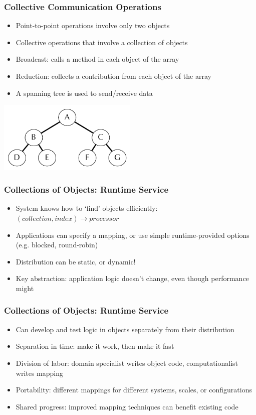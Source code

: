 \begin{frame}[fragile]
  \frametitle{Collective Communication Operations}
  \begin{itemize}
    \item Point-to-point operations involve only two objects
    \item Collective operations that involve a collection of objects
    \item Broadcast: calls a method in each object of the array
    \item Reduction: collects a contribution from each object of the array
    \item A spanning tree is used to send/receive data
  \end{itemize}
    \begin{center} \includegraphics[width=0.5\textwidth]{figures/spanningTree.pdf} \end{center}
\end{frame}

\begin{frame}[fragile]
  \frametitle{Collections of Objects: Runtime Service}
  \begin{itemize}
    \item System knows how to `find' objects efficiently: $(collection, index) \to processor$
    \item Applications can specify a mapping, or use simple
      runtime-provided options (e.g. blocked, round-robin)
    \item Distribution can be static, or dynamic!
    \item Key abstraction: application logic doesn't change, even
      though performance might
  \end{itemize}
\end{frame}

\begin{frame}[fragile]
  \frametitle{Collections of Objects: Runtime Service}
  \begin{itemize}
    \item Can develop and test logic in objects separately from their distribution
    \item Separation in time: make it work, then make it fast
    \item Division of labor: domain specialist writes object code, computationalist writes mapping
    \item Portability: different mappings for different systems, scales, or configurations
    \item Shared progress: improved mapping techniques can benefit existing code
  \end{itemize}
\end{frame}


